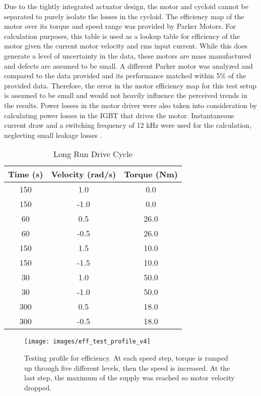 Due to the tightly integrated actuator design, the motor and cycloid cannot be separated to purely isolate the losses in the cycloid.
The efficiency map of the motor over its torque and speed range was provided by Parker Motors.
For calculation purposes, this table is used as a lookup table for efficiency of the motor given the current motor velocity and rms input current.
While this does generate a level of uncertainty in the data, these motors are mass manufactured and defects are assumed to be small.
A different Parker motor was analyzed and compared to the data provided and its performance matched within 5\% of the provided data. Therefore, the error in the motor efficiency map for this test setup is assumed to be small and would not heavily influence the perceived trends in the results.
Power losses in the motor driver were also taken into consideration by calculating power losses in the IGBT that drives the motor.
Instantaneous current draw and a switching frequency of 12 kHz were used for the calculation, neglecting small leakage losses \cite{IGBTPower}.

\begin{table}[t]
	\vskip0.2cm
	\caption{Long Run Drive Cycle}
	\label{table_2}
	\begin{center}
		\vskip-0.2cm
		\begin{tabular}{|c||c||c|}
			\hline
			Time (s) & Velocity (rad/s) & Torque (Nm)\\
			\hline
			150 & 1.0 & 0.0\\
			\hline
			150 & -1.0 & 0.0\\
			\hline
			60 & 0.5 & 26.0\\
			\hline
			60 & -0.5 & 26.0\\
			\hline
			150 & 1.5 & 10.0\\
			\hline
			150 & -1.5 & 10.0\\
			\hline
			30 & 1.0 & 50.0\\
			\hline
			30 & -1.0 & 50.0\\
			\hline
			300 & 0.5 & 18.0\\
			\hline
			300 & -0.5 & 18.0\\
			\hline
		\end{tabular}
	\end{center}
\end{table}

\begin{figure}[!b]
   \centering
   \texttt{[image: images/eff\_test\_profile\_v4]}
   \caption{Testing profile for efficiency.
   At each speed step, torque is ramped up through five different levels, then the speed is increased.
   At the last step, the maximum of the supply was reached so motor velocity dropped.}
   \label{eff_profile}
\end{figure}

